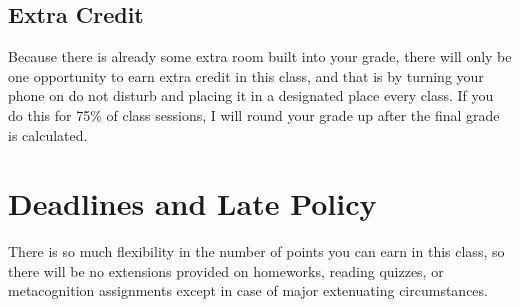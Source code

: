 \documentclass[
  letterpaper,
  DIV=11,
  numbers=noendperiod]{scrartcl}
\begin{document}
\subsection{Extra Credit}\label{roundup}

Because there is already some extra room built into your grade, there
will only be one opportunity to earn extra credit in this class, and
that is by turning your phone on do not disturb and placing it in a
designated place every class. If you do this for 75\% of class sessions,
I will round your grade up after the final grade is calculated.

\section{Deadlines and Late Policy}\label{deadlines}

There is so much flexibility in the number of points you can earn in
this class, so there will be no extensions provided on homeworks,
reading quizzes, or metacognition assignments except in case of major
extenuating circumstances.
\end{document}
